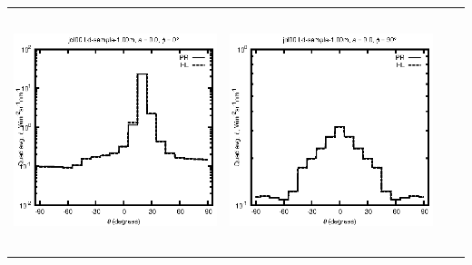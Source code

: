 \begin{tabular}{c c c c}
\includegraphics[height=7cm]{../eps/jol00_Ld_sample_1.00m_fwd.eps} &
\includegraphics[height=7cm]{../eps/jol00_Ld_sample_1.00m_cross.eps} \\
\end{tabular}

\pagebreak


